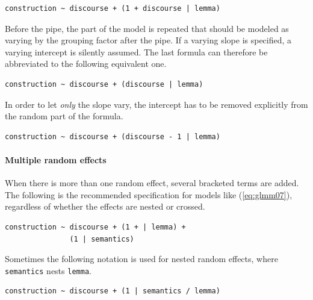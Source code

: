 \documentclass[a4paper,12pt]{article}
\begin{document}
\vspace{0.5\baselineskip}

\begin{lstlisting}
construction ~ discourse + (1 + discourse | lemma)
\end{lstlisting}

Before the pipe, the part of the model is repeated that should be modeled as varying by the grouping factor after the pipe.
If a varying slope is specified, a varying intercept is silently assumed.
The last formula can therefore be abbreviated to the following equivalent one.

\vspace{0.5\baselineskip}

\begin{lstlisting}
construction ~ discourse + (discourse | lemma)
\end{lstlisting}

In order to let \textit{only} the slope vary, the intercept has to be removed explicitly from the random part of the formula.

\vspace{0.5\baselineskip}

\begin{lstlisting}
construction ~ discourse + (discourse - 1 | lemma)
\end{lstlisting}

\paragraph{Multiple random effects}

When there is more than one random effect, several bracketed terms are added.
The following is the recommended specification for models like (\ref{eq:glmm07}), regardless of whether the effects are nested or crossed.

\pagebreak

\vspace{0.5\baselineskip}

\begin{lstlisting}
construction ~ discourse + (1 + | lemma) +
               (1 | semantics)
\end{lstlisting}

Sometimes the following notation is used for nested random effects, where \texttt{semantics} nests \texttt{lemma}.

\vspace{0.5\baselineskip}

\begin{lstlisting}
construction ~ discourse + (1 | semantics / lemma)
\end{lstlisting}
\end{document}
